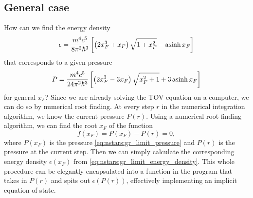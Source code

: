 \subsection{General case}

How can we find the energy density
\begin{equation}
	\epsilon = \frac{m^4 c^5}{8 \pi^2 \hbar^3} \left[ \left( 2 x_F^3 + x_F \right) \sqrt{1 + x_F^2} - \operatorname{asinh} x_F \right]
\label{eq:nstars:gr_limit_energy_density}
\end{equation}
that corresponds to a given pressure
\begin{equation}
	P = \frac{m^4 c^5}{24 \pi^2 \hbar^3} \left[ \left( 2 x_F^3 - 3 x_F \right) \sqrt{x_F^2 + 1} + 3 \operatorname{asinh} x_F \right] 
\label{eq:nstars:gr_limit_pressure}
\end{equation}
for general $x_F$?
Since we are already solving the TOV equation on a computer, we can do so by numerical root finding.
At every step $r$ in the numerical integration algorithm, we know the current pressure $P(r)$.
Using a numerical root finding algorithm, we can find the root $x_F$ of the function
\begin{equation}
	f(x_F) = P(x_F) - P(r) = 0,
\end{equation}
where $P(x_F)$ is the pressure \eqref{eq:nstars:gr_limit_pressure} and $P(r)$ is the pressure at the current step.
Then we can simply calculate the corresponding energy density $\epsilon(x_F)$ from \cref{eq:nstars:gr_limit_energy_density}.
This whole procedure can be elegantly encapsulated into a function in the program that takes in $P(r)$ and spits out $\epsilon(P(r))$, effectively implementing an implicit equation of state.

\iffalse
\begin{equation}
	\diml{P}(x_F) = \frac{m^4 c^3 r_0^3}{18 \pi m_0 \hbar^3} \left[ (2 x_F^3 - 3 x_F) \sqrt{x_F^2 + 1} + 3 \asinh x_F \right]
\end{equation}

At every integration step, we have a value of the pressure $P$.
Then find the root $x_F$ of
\begin{equation}
	P(x_F) - P = 0
\end{equation}
and then calculate
\begin{equation}
	\diml{ϵ} = \diml{ϵ}(x_F) = \diml{P}(x_F) = \frac{m^4 c^3 r_0^3}{6 \pi m_0 \hbar^3} \left[ (2 x_F^3 + x_F) \sqrt{x_F^2 + 1} - \asinh x_F \right]
\end{equation}
\fi


\begin{figure}
\end{figure}
